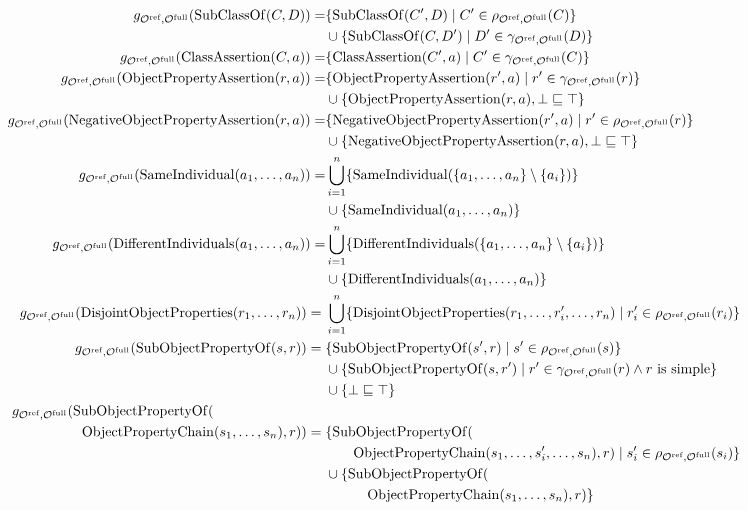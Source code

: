 {\scriptsize
\begin{align*}
    g_{\Omcref,\Omcfull}(\mathrm{SubClassOf}(C, D)) =& \{\mathrm{SubClassOf}(C', D) \mid C' \in \rho_{\Omcref,\Omcfull} (C)\} \\& \cup \{\mathrm{SubClassOf}(C, D') \mid D' \in \gamma_{\Omcref,\Omcfull}  (D)\} \\
    g_{\Omcref,\Omcfull}(\mathrm{ClassAssertion}(C, a)) =& \{\mathrm{ClassAssertion}(C', a) \mid C' \in \gamma_{\Omcref,\Omcfull}  (C)\} \\
    g_{\Omcref,\Omcfull}(\mathrm{ObjectPropertyAssertion}(r, a)) =& \{\mathrm{ObjectPropertyAssertion}(r', a) \mid r' \in \gamma_{\Omcref,\Omcfull}  (r)\} \\& \cup \{ \mathrm{ObjectPropertyAssertion}(r, a), \bot \sqsubseteq \top \} \\
    g_{\Omcref,\Omcfull}(\mathrm{NegativeObjectPropertyAssertion}(r, a)) =& \{\mathrm{NegativeObjectPropertyAssertion}(r', a) \mid r' \in \rho_{\Omcref,\Omcfull}  (r)\} \\& \cup \{\mathrm{NegativeObjectPropertyAssertion}(r, a), \bot \sqsubseteq \top \} \\
    g_{\Omcref,\Omcfull}(\mathrm{SameIndividual}(a_1, \dots, a_n)) =& \bigcup_{i=1}^n \{ \mathrm{SameIndividual}(\{a_1, \dots, a_n\} \setminus \{a_i\}) \} \\& \cup \{ \mathrm{SameIndividual}(a_1, \dots, a_n)\} \\
    g_{\Omcref,\Omcfull}(\mathrm{DifferentIndividuals}(a_1, \dots, a_n)) =& \bigcup_{i=1}^n \{ \mathrm{DifferentIndividuals}(\{a_1, \dots, a_n\} \setminus \{a_i\}) \} \\& \cup \{ \mathrm{DifferentIndividuals}(a_1, \dots, a_n)\} \\
    g_{\Omcref,\Omcfull}(\mathrm{DisjointObjectProperties}(r_1, \dots, r_n)) ={} & \bigcup_{i=1}^n \{ \mathrm{DisjointObjectProperties}(r_1, \dots, r_i', \dots, r_n) \mid r_i' \in \rho_{\Omcref,\Omcfull}(r_i) \} \\
    g_{\Omcref,\Omcfull}(\mathrm{SubObjectPropertyOf}(s, r)) ={} & \{\mathrm{SubObjectPropertyOf}(s', r) \mid s' \in \rho_{\Omcref,\Omcfull} (s)\} \\& \cup \{\mathrm{SubObjectPropertyOf}(s, r') \mid r' \in \gamma_{\Omcref,\Omcfull}  (r) \land r \text{ is simple}\} \\& \cup \{ \bot \sqsubseteq \top \} \\
    g_{\Omcref,\Omcfull}(\mathrm{SubObjectPropertyOf}(\qquad \qquad \qquad \qquad &\\\mathrm{ObjectPropertyChain}(s_1, \dots, s_n), r)) ={} & \{\mathrm{SubObjectPropertyOf}( \\& \qquad \mathrm{ObjectPropertyChain}(s_1, \dots, s_i', \dots, s_n), r) \mid s_i' \in \rho_{\Omcref,\Omcfull} (s_i)\} \\& \cup \{\mathrm{SubObjectPropertyOf}( \\& \quad \qquad \mathrm{ObjectPropertyChain}(s_1, \dots, s_n), r)\} \\

\end{align*}}
